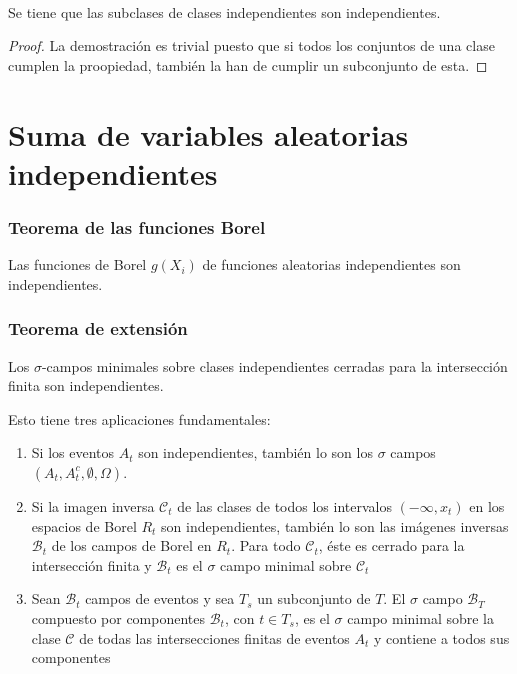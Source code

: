 \documentclass[12pt,a4paper]{book}
\begin{document}
\begin{theorem}
	\
	
Se tiene que las subclases de clases independientes son independientes.
\end{theorem}

\begin{proof}
	La demostración es trivial puesto que si todos los conjuntos de una clase cumplen la proopiedad, también la han de cumplir un subconjunto de esta.
\end{proof}

\section{Suma de variables aleatorias independientes}
\subsubsection{Teorema de las funciones Borel}
\begin{theorem}
Las funciones de Borel $g(X_i)$ de funciones aleatorias independientes son independientes.
\end{theorem}

\subsubsection{Teorema de extensión}
\begin{theorem}
Los $\sigma$-campos minimales sobre clases independientes cerradas para la intersección finita son independientes.
\end{theorem}
Esto tiene tres aplicaciones fundamentales:
\begin{enumerate}
\item Si los eventos $A_t$ son independientes, también lo son los $\sigma$ campos $(A_t , A_t^c , \emptyset , \Omega)$.
\item Si la imagen inversa $\mathcal{C}_t$ de las clases de todos los intervalos $(-\infty, x_t)$ en los espacios de Borel $R_t$ son independientes, también lo son las imágenes inversas $\mathcal{B}_t$ de los campos de Borel en $R_t$. Para todo $\mathcal{C}_t$, éste es cerrado para la intersección finita y $\mathcal{B}_t$ es el $\sigma$ campo minimal sobre $\mathcal{C}_t$
\item Sean $\mathcal{B}_t$ campos de eventos y sea $T_s$ un subconjunto de $T$. El $\sigma$ campo $\mathcal{B}_T$ compuesto por componentes $\mathcal{B}_t$, con $t\in T_s$, es el $\sigma$ campo minimal sobre la clase $\mathcal{C}$ de todas las intersecciones finitas de eventos $A_t$ y contiene a todos sus componentes
\end{enumerate}
\end{document}
